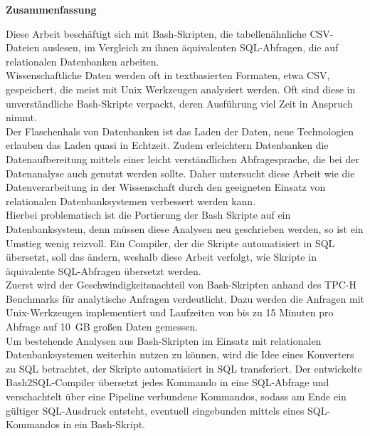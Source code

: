 

\clearemptydoublepage






\vspace*{2cm}
\begin{center}
{\Large \bf Zusammenfassung}
\end{center}
\vspace{1cm}

Diese Arbeit beschäftigt sich mit Bash-Skripten, die tabellenähnliche CSV-Dateien auslesen, im Vergleich zu ihnen äquivalenten SQL-Abfragen, die auf relationalen Datenbanken arbeiten.\\

Wissenschaftliche Daten werden oft in textbasierten Formaten, etwa CSV, gespeichert, die meist mit Unix Werkzeugen analysiert werden. Oft sind diese in unverständliche Bash-Skripte verpackt, deren Ausführung viel Zeit in Anspruch nimmt.\\

Der Flaschenhals von Datenbanken ist das Laden der Daten, neue Technologien erlauben das Laden quasi in Echtzeit. Zudem erleichtern Datenbanken die Datenaufbereitung mittels einer leicht verständlichen Abfragesprache, die bei der Datenanalyse auch genutzt werden sollte. Daher untersucht diese Arbeit wie die Datenverarbeitung in der Wissenschaft durch den geeigneten Einsatz von relationalen Datenbanksystemen verbessert werden kann.\\

Hierbei problematisch ist die Portierung der Bash Skripte auf ein Datenbanksystem, denn müssen diese Analysen neu geschrieben werden, so ist ein Umstieg wenig reizvoll. Ein Compiler, der die Skripte automatisiert in SQL übersetzt, soll das ändern, weshalb diese Arbeit verfolgt, wie Skripte in äquivalente SQL-Abfragen übersetzt werden.\\

Zuerst wird der Geschwindigkeitsnachteil von Bash-Skripten anhand des TPC-H Benchmarks für analytische Anfragen verdeutlicht. Dazu werden die Anfragen mit Unix-Werk\-zeu\-gen implementiert und Laufzeiten von bis zu 15 Minuten pro Abfrage auf 10\ GB großen Daten gemessen.\\

Um bestehende Analysen aus Bash-Skripten im Einsatz mit relationalen Da\-ten\-bank\-sys\-te\-men weiterhin nutzen zu können, wird die Idee eines Konverters zu SQL betrachtet, der Skripte automatisiert in SQL transferiert.
Der entwickelte Bash2SQL-Compiler übersetzt jedes Kommando in eine SQL-Abfrage und verschachtelt über eine Pipeline verbundene Kommandos, sodass am Ende ein gültiger SQL-Ausdruck entsteht, eventuell eingebunden mittels eines SQL-Kommandos in ein Bash-Skript.

